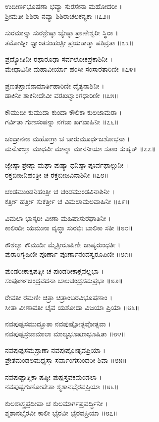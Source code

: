 ಉದೀರ್ಣಭೂಷಣಾ ಭವ್ಯಾ ಸುರಸೇನಾ ಮಹೋದರೀ ।\\
ಶ್ರೀಮತೀ ಶಿಶಿರಾ ನವ್ಯಾ ಶಿಶಿರಾಚಲಕನ್ಯಕಾ ॥೭೨॥

ಸುರಮಾನ್ಯಾ ಸುರಶ್ರೇಷ್ಠಾ ಜ್ಯೇಷ್ಠಾ ಪ್ರಾಣೇಶ್ವರೀ ಸ್ಥಿರಾ ।\\
ತಮೋಘ್ನೀ ಧ್ವಾಂತಸಂಹಂತ್ರೀ ಪ್ರಯತಾತ್ಮಾ ಪತಿವ್ರತಾ ॥೭೩॥

ಪ್ರದ್ಯೋತಿನೀ ರಥಾರೂಢಾ ಸರ್ವಲೋಕಪ್ರಕಾಶಿನೀ ।\\
ಮೇಧಾವಿನೀ ಮಹಾವೀರ್ಯಾ ಹಂಸೀ ಸಂಸಾರತಾರಿಣೀ ॥೭೪॥

ಪ್ರಣತಪ್ರಾಣಿನಾಮಾರ್ತಿಹಾರಿಣೀ ದೈತ್ಯನಾಶಿನೀ ।\\
ಡಾಕಿನೀ ಶಾಕಿನೀದೇವೀ ವರಖಟ್ವಾಂಗಧಾರಿಣೀ ॥೭೫॥

ಕೌಮುದೀ ಕುಮುದಾ ಕುಂದಾ ಕೌಲಿಕಾ ಕುಲಜಾಮರಾ ।\\
ಗರ್ವಿತಾ ಗುಣಸಂಪನ್ನಾ ನಗಜಾ ಖಗವಾಹಿನೀ ॥೭೬॥

ಚಂದ್ರಾನನಾ ಮಹೋಗ್ರಾ ಚ ಚಾರುಮೂರ್ಧಜಶೋಭನಾ ।\\
ಮನೋಜ್ಞಾ ಮಾಧವೀ ಮಾನ್ಯಾ ಮಾನನೀಯಾ ಸತಾಂ ಸುಹೃತ್ ॥೭೭॥

ಜ್ಯೇಷ್ಠಾ ಶ್ರೇಷ್ಠಾ ಮಘಾ ಪುಷ್ಯಾ ಧನಿಷ್ಠಾ ಪೂರ್ವಫಾಲ್ಗುನೀ ।\\
ರಕ್ತಬೀಜನಿಹಂತ್ರೀ ಚ ರಕ್ತಬೀಜವಿನಾಶಿನೀ ॥೭೮॥

ಚಂಡಮುಂಡನಿಹಂತ್ರೀ ಚ ಚಂಡಮುಂಡವಿನಾಶಿನೀ ।\\
ಕರ್ತ್ರೀ ಹರ್ತ್ರೀ ಸುಕರ್ತ್ರೀ ಚ ವಿಮಲಾಮಲವಾಹಿನೀ ॥೭೯॥

ವಿಮಲಾ ಭಾಸ್ಕರೀ ವೀಣಾ ಮಹಿಷಾಸುರಘಾತಿನೀ ।\\
ಕಾಲಿಂದೀ ಯಮುನಾ ವೃದ್ಧಾ ಸುರಭಿಃ ಬಾಲಿಕಾ ಸತೀ ॥೮೦॥

ಕೌಶಲ್ಯಾ ಕೌಮುದೀ ಮೈತ್ರೀರೂಪಿಣೀ ಚಾಪ್ಯರುಂಧತೀ ।\\
ಪುರಾರಿಗೃಹಿಣೀ ಪೂರ್ಣಾ ಪೂರ್ಣಾನಂದಸ್ವರೂಪಿಣೀ ॥೮೧॥

ಪುಂಡರೀಕಾಕ್ಷಪತ್ನೀ ಚ ಪುಂಡರೀಕಾಕ್ಷವಲ್ಲಭಾ ।\\
ಸಂಪೂರ್ಣಚಂದ್ರವದನಾ ಬಾಲಚಂದ್ರಸಮಪ್ರಭಾ ॥೮೨॥

ರೇವತೀ ರಮಣೀ ಚಿತ್ರಾ ಚಿತ್ರಾಂಬರವಿಭೂಷಣಾಂ ।\\
ಸೀತಾ ವೀಣಾವತೀ ಚೈವ ಯಶೋದಾ ವಿಜಯಾ ಪ್ರಿಯಾ ॥೮೩॥

ನವಪುಷ್ಪಸಮುದ್ಭೂತಾ ನವಪುಷ್ಪೋತ್ಸವೋತ್ಸವಾ ।\\
ನವಪುಷ್ಪಸ್ರಜಾಮಾಲಾ ಮಾಲ್ಯಭೂಷಣಭೂಷಿತಾ ॥೮೪॥

ನವಪುಷ್ಪಸಮಪ್ರಾಣಾ ನವಪುಷ್ಪೋತ್ಸವಪ್ರಿಯಾ ।\\
ಪ್ರೇತಮಂಡಲಮಧ್ಯಸ್ತಾ ಸರ್ವಾಂಗಸುಂದರೀ ಶಿವಾ ॥೮೫॥

ನವಪುಷ್ಪಾತ್ಮಿಕಾ ಷಷ್ಠೀ ಪುಷ್ಪಸ್ತವಕಮಂಡಲಾ ।\\
ನವಪುಷ್ಪಗುಣೋಪೇತಾ ಶ್ಮಶಾನಭೈರವಪ್ರಿಯಾ ॥೮೬॥

ಕುಲಶಾಸ್ತ್ರಪ್ರದೀಪಾ ಚ ಕುಲಮಾರ್ಗಪ್ರವರ್ದ್ಧಿನೀ ।\\
ಶ್ಮಶಾನಭೈರವೀ ಕಾಲೀ ಭೈರವೀ ಭೈರವಪ್ರಿಯಾ ॥೮೭॥

